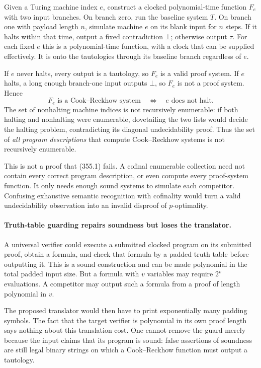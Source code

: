 \documentclass[11pt]{article}
\begin{document}
Given a Turing machine index $e$, construct a clocked polynomial-time
function $F_e$ with two input branches. On branch zero, run the baseline
system $T$. On branch one with payload length $n$, simulate machine
$e$ on its blank input for $n$ steps. If it halts within that time,
output a fixed contradiction $\bot$; otherwise output $\tau$.
For each fixed $e$ this is a polynomial-time function, with a clock
that can be supplied effectively. It is onto the tautologies through
its baseline branch regardless of $e$.

If $e$ never halts, every output is a tautology, so $F_e$ is a valid
proof system. If $e$ halts, a long enough branch-one input outputs
$\bot$, so $F_e$ is not a proof system. Hence
\[
 F_e\text{ is a Cook--Reckhow system}
   \quad\Longleftrightarrow\quad e\text{ does not halt}.
 \tag{355.2}
\]
The set of nonhalting machine indices is not recursively enumerable:
if both halting and nonhalting were enumerable, dovetailing the two
lists would decide the halting problem, contradicting its diagonal
undecidability proof. Thus the set of \emph{all program descriptions}
that compute Cook--Reckhow systems is not recursively enumerable.

This is not a proof that (355.1) fails. A cofinal enumerable collection
need not contain every correct program description, or even compute
every proof-system function. It only needs enough sound systems to
simulate each competitor. Confusing exhaustive semantic recognition
with cofinality would turn a valid undecidability observation into an
invalid disproof of $p$-optimality.

\paragraph{Truth-table guarding repairs soundness but loses the translator.}
A universal verifier could execute a submitted clocked program on its
submitted proof, obtain a formula, and check that formula by a padded
truth table before outputting it. This is a sound construction and can
be made polynomial in the total padded input size. But a formula with
$v$ variables may require $2^v$ evaluations. A competitor may output
such a formula from a proof of length polynomial in $v$.

The proposed translator would then have to print exponentially many
padding symbols. The fact that the target verifier is polynomial in
its own proof length says nothing about this translation cost. One
cannot remove the guard merely because the input claims that its
program is sound: false assertions of soundness are still legal
binary strings on which a Cook--Reckhow function must output a tautology.
\end{document}
